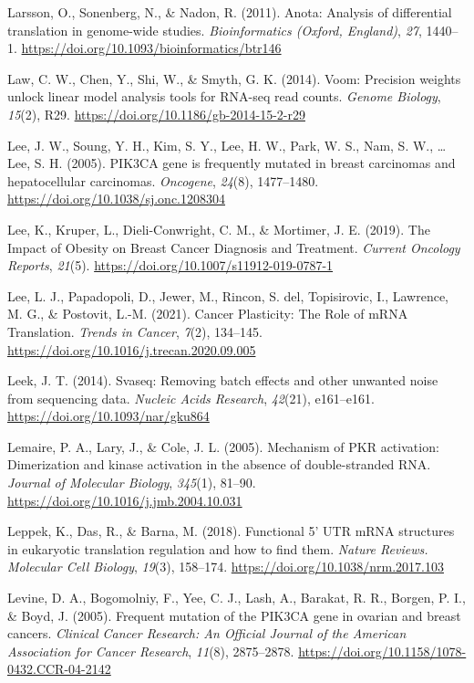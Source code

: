\documentclass[12pt,openany]{book}
\begin{document}
\hypertarget{ref-Larsson2011}{}
Larsson, O., Sonenberg, N., \& Nadon, R. (2011). Anota: Analysis of
differential translation in genome-wide studies. \emph{Bioinformatics
(Oxford, England)}, \emph{27}, 1440--1.
\url{https://doi.org/10.1093/bioinformatics/btr146}

\hypertarget{ref-Law2014}{}
Law, C. W., Chen, Y., Shi, W., \& Smyth, G. K. (2014). Voom: Precision
weights unlock linear model analysis tools for RNA-seq read counts.
\emph{Genome Biology}, \emph{15}(2), R29.
\url{https://doi.org/10.1186/gb-2014-15-2-r29}

\hypertarget{ref-Lee2005}{}
Lee, J. W., Soung, Y. H., Kim, S. Y., Lee, H. W., Park, W. S., Nam, S.
W., \ldots{} Lee, S. H. (2005). PIK3CA gene is frequently mutated in
breast carcinomas and hepatocellular carcinomas. \emph{Oncogene},
\emph{24}(8), 1477--1480. \url{https://doi.org/10.1038/sj.onc.1208304}

\hypertarget{ref-Lee2019}{}
Lee, K., Kruper, L., Dieli-Conwright, C. M., \& Mortimer, J. E. (2019).
The Impact of Obesity on Breast Cancer Diagnosis and Treatment.
\emph{Current Oncology Reports}, \emph{21}(5).
\url{https://doi.org/10.1007/s11912-019-0787-1}

\hypertarget{ref-Lee2021}{}
Lee, L. J., Papadopoli, D., Jewer, M., Rincon, S. del, Topisirovic, I.,
Lawrence, M. G., \& Postovit, L.-M. (2021). Cancer Plasticity: The Role
of mRNA Translation. \emph{Trends in Cancer}, \emph{7}(2), 134--145.
\url{https://doi.org/10.1016/j.trecan.2020.09.005}

\hypertarget{ref-Leek2014}{}
Leek, J. T. (2014). Svaseq: Removing batch effects and other unwanted
noise from sequencing data. \emph{Nucleic Acids Research},
\emph{42}(21), e161--e161. \url{https://doi.org/10.1093/nar/gku864}

\hypertarget{ref-Lemaire2005}{}
Lemaire, P. A., Lary, J., \& Cole, J. L. (2005). Mechanism of PKR
activation: Dimerization and kinase activation in the absence of
double-stranded RNA. \emph{Journal of Molecular Biology}, \emph{345}(1),
81--90. \url{https://doi.org/10.1016/j.jmb.2004.10.031}

\hypertarget{ref-Leppek2018}{}
Leppek, K., Das, R., \& Barna, M. (2018). Functional 5' UTR mRNA
structures in eukaryotic translation regulation and how to find them.
\emph{Nature Reviews. Molecular Cell Biology}, \emph{19}(3), 158--174.
\url{https://doi.org/10.1038/nrm.2017.103}

\hypertarget{ref-Levine2005}{}
Levine, D. A., Bogomolniy, F., Yee, C. J., Lash, A., Barakat, R. R.,
Borgen, P. I., \& Boyd, J. (2005). Frequent mutation of the PIK3CA gene
in ovarian and breast cancers. \emph{Clinical Cancer Research: An
Official Journal of the American Association for Cancer Research},
\emph{11}(8), 2875--2878.
\url{https://doi.org/10.1158/1078-0432.CCR-04-2142}
\end{document}
